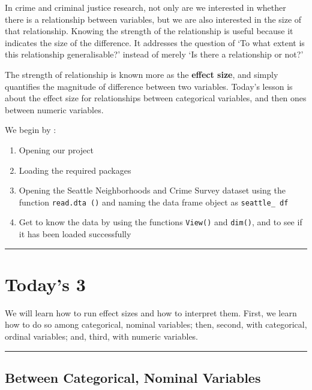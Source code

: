 \documentclass[
]{book}
\begin{document}
In crime and criminal justice research, not only are we interested in whether there is a relationship between variables, but we are also interested in the size of that relationship. Knowing the strength of the relationship is useful because it indicates the size of the difference. It addresses the question of `To what extent is this relationship generalisable?' instead of merely `Is there a relationship or not?'

The strength of relationship is known more as the \textbf{effect size}, and simply quantifies the magnitude of difference between two variables. Today's lesson is about the effect size for relationships between categorical variables, and then ones between numeric variables.

We begin by :

\begin{enumerate}
\def\labelenumi{\arabic{enumi}.}
\item
  Opening our project
\item
  Loading the required packages
\item
  Opening the Seattle Neighborhoods and Crime Survey dataset using the function \texttt{read.dta\ ()} and naming the data frame object as \texttt{seattle\_\ df}
\item
  Get to know the data by using the functions \texttt{View()} and \texttt{dim()}, and to see if it has been loaded successfully
\end{enumerate}

\begin{center}\rule{0.5\linewidth}{0.5pt}\end{center}

\hypertarget{todays-3-5}{%
\section{Today's 3}\label{todays-3-5}}

We will learn how to run effect sizes and how to interpret them. First, we learn how to do so among categorical, nominal variables; then, second, with categorical, ordinal variables; and, third, with numeric variables.

\begin{center}\rule{0.5\linewidth}{0.5pt}\end{center}

\hypertarget{between-categorical-nominal-variables}{%
\subsection{Between Categorical, Nominal Variables}\label{between-categorical-nominal-variables}}
\end{document}
